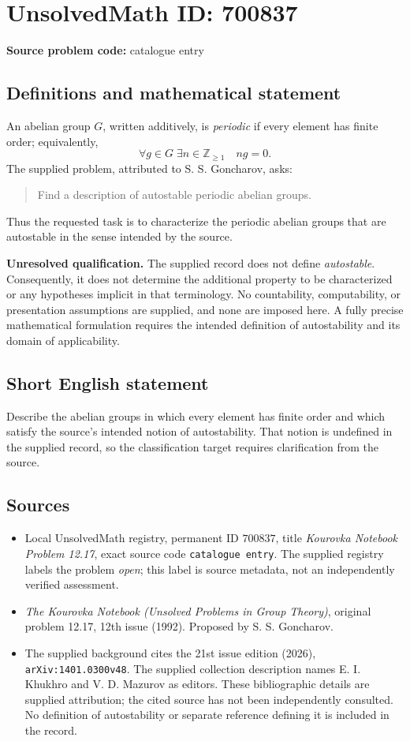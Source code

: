 \documentclass[11pt]{article}
\newcommand{\Z}{\mathbb{Z}}
\begin{document}
\section*{UnsolvedMath ID: 700837}
\textbf{Source problem code:} catalogue entry
\subsection{Definitions and mathematical statement}
An abelian group \(G\), written additively, is \emph{periodic} if every element has finite order; equivalently,
\[
\forall g\in G\;\exists n\in\Z_{\geq 1}\quad ng=0.
\]
The supplied problem, attributed to S. S. Goncharov, asks:
\begin{quote}
Find a description of autostable periodic abelian groups.
\end{quote}
Thus the requested task is to characterize the periodic abelian groups that are autostable in the sense intended by the source.

\textbf{Unresolved qualification.} The supplied record does not define \emph{autostable}. Consequently, it does not determine the additional property to be characterized or any hypotheses implicit in that terminology. No countability, computability, or presentation assumptions are supplied, and none are imposed here. A fully precise mathematical formulation requires the intended definition of autostability and its domain of applicability.
\subsection{Short English statement}
Describe the abelian groups in which every element has finite order and which satisfy the source's intended notion of autostability. That notion is undefined in the supplied record, so the classification target requires clarification from the source.
\subsection{Sources}
\begin{itemize}
\item Local UnsolvedMath registry, permanent ID \(700837\), title \emph{Kourovka Notebook Problem 12.17}, exact source code \texttt{catalogue entry}. The supplied registry labels the problem \emph{open}; this label is source metadata, not an independently verified assessment.
\item \emph{The Kourovka Notebook (Unsolved Problems in Group Theory)}, original problem 12.17, 12th issue (1992). Proposed by S. S. Goncharov.
\item The supplied background cites the 21st issue edition (2026), \texttt{arXiv:1401.0300v48}. The supplied collection description names E. I. Khukhro and V. D. Mazurov as editors. These bibliographic details are supplied attribution; the cited source has not been independently consulted. No definition of autostability or separate reference defining it is included in the record.
\end{itemize}
\end{document}
